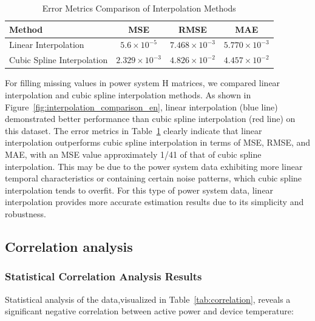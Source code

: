 \documentclass[12pt]{article}
\begin{document}
\begin{table}[htbp]
    \centering
    
    \label{tab:interpolation_errors_en}
    \begin{tabular}{lccc}
        \toprule
        \textbf{Method} & \textbf{MSE} & \textbf{RMSE} & \textbf{MAE} \\
        \midrule
        Linear Interpolation & $5.6 \times 10^{-5}$ & $7.468 \times 10^{-3}$ & $5.770 \times 10^{-3}$ \\
        Cubic Spline Interpolation & $2.329 \times 10^{-3}$ & $4.826 \times 10^{-2}$ & $4.457 \times 10^{-2}$ \\
        \bottomrule
    \end{tabular}
    \caption{Error Metrics Comparison of Interpolation Methods}
\end{table}

For filling missing values in power system H matrices, we compared linear interpolation and cubic spline interpolation methods. As shown in Figure~\ref{fig:interpolation_comparison_en}, linear interpolation (blue line) demonstrated better performance than cubic spline interpolation (red line) on this dataset. The error metrics in Table~\ref{tab:interpolation_errors_en} clearly indicate that linear interpolation outperforms cubic spline interpolation in terms of MSE, RMSE, and MAE, with an MSE value approximately 1/41 of that of cubic spline interpolation. This may be due to the power system data exhibiting more linear temporal characteristics or containing certain noise patterns, which cubic spline interpolation tends to overfit. For this type of power system data, linear interpolation provides more accurate estimation results due to its simplicity and robustness.


\subsection*{Correlation analysis}

\subsubsection*{Statistical Correlation Analysis Results}

Statistical analysis of the data,visualized in Table~\ref{tab:correlation}, reveals a significant negative correlation between active power and device temperature:
\end{document}
